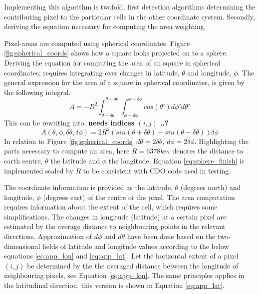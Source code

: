 Implementing this algorithm is twofold, first detection algorithms determining the contributing pixel to the particular cells in the other coordinate system. Secondly,  deriving the equation necessary for computing the area weighting. 

Pixel-areas are computed using spherical coordinates. Figure \ref{fig:spherical_coords} shows how a square looks projected on to a sphere. Deriving the equation for computing the area of an square in spherical coordinates, requires integrating over changes in latitude, $\theta$ and longitude, $\phi$. The general expression for the area of a square in spherical coordinates, is given by the following integral. 
\begin{equation} \label{eq:sphere_integral}
    A = -R^2\int_{ \theta - \delta \theta }^{\theta + \delta \theta} \int_{ \phi - \delta \phi }^{\phi + \delta \phi} cos\left( \theta' \right) d\phi' d\theta'
\end{equation}
This can be rewriting into, \textbf{needs indices $(i, j)$ ..?}
\begin{equation} \label{eq:sphere_finish}
    A \left( \theta, \phi, \delta \theta, \delta \phi   \right)= 2R^2 \left( sin\left( \theta + \delta \theta  \right) - sin\left(  \theta - \delta \theta  \right) \right) \delta \phi
\end{equation}
In relation to Figure \ref{fig:spherical_coords} $d \theta = 2 \delta \theta$, $d \phi = 2 \delta \phi$. Highlighting the parts necessary to compute an area, here $R=6378km$ denotes the distance to earth centre, $\theta$ the latitude and $\phi$ the longitude. Equation \ref{eq:sphere_finish} is implemented scaled by $R$ to be consistent with CDO code used in testing. 

The coordinate information is provided as the latitude, $\theta$ (degrees north) and longitude, $\phi$ (degrees east) of the centre of the pixel. The area computation requires information about the extent of the cell, which requires some simplifications. The changes in longitude (latitude) at a certain pixel are estimated by the average distance to neighbouring points in the relevant directions. Approximation of $d\phi$ and $d\theta$ have been done based on the two-dimensional fields of latitude and longitude values according to the below equations \eqref{eq:app_lon} and  \eqref{eq:app_lat}. Let the horizontal extent of a pixel $(i,j)$ be determined by the the averaged distance between the longitude of neighbouring pixels, see Equation \eqref{eq:app_lon}. The same principles applies in the latitudinal direction, this version is shown in Equation \ref{eq:app_lat}.

